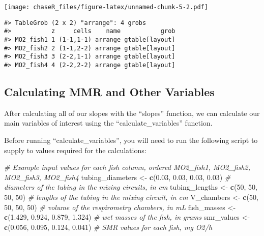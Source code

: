 \documentclass[
]{article}
\newenvironment{Shaded}{\begin{snugshade}}{\end{snugshade}}
\newcommand{\CommentTok}[1]{\textcolor[rgb]{0.56,0.35,0.01}{\textit{#1}}}
\newcommand{\DecValTok}[1]{\textcolor[rgb]{0.00,0.00,0.81}{#1}}
\newcommand{\FloatTok}[1]{\textcolor[rgb]{0.00,0.00,0.81}{#1}}
\newcommand{\FunctionTok}[1]{\textcolor[rgb]{0.13,0.29,0.53}{\textbf{#1}}}
\newcommand{\NormalTok}[1]{#1}
\newcommand{\OtherTok}[1]{\textcolor[rgb]{0.56,0.35,0.01}{#1}}
\begin{document}
\texttt{[image: chaseR\_files/figure-latex/unnamed-chunk-5-2.pdf]}

\begin{verbatim}
#> TableGrob (2 x 2) "arrange": 4 grobs
#>           z     cells    name           grob
#> MO2_fish1 1 (1-1,1-1) arrange gtable[layout]
#> MO2_fish2 2 (1-1,2-2) arrange gtable[layout]
#> MO2_fish3 3 (2-2,1-1) arrange gtable[layout]
#> MO2_fish4 4 (2-2,2-2) arrange gtable[layout]
\end{verbatim}

\subsection{Calculating MMR and Other
Variables}\label{calculating-mmr-and-other-variables}

After calculating all of our slopes with the ``slopes'' function, we can
calculate our main variables of interest using the
``calculate\_variables'' function.

Before running ``calculate\_variables'', you will need to run the
following script to supply to values required for the calculations:

\begin{Shaded}
\begin{Highlighting}[]
\CommentTok{\# Example input values for each fish column, ordered MO2\_fish1, MO2\_fish2, MO2\_fish3, MO2\_fish4}
\NormalTok{tubing\_diameters }\OtherTok{\textless{}{-}} \FunctionTok{c}\NormalTok{(}\FloatTok{0.03}\NormalTok{, }\FloatTok{0.03}\NormalTok{, }\FloatTok{0.03}\NormalTok{, }\FloatTok{0.03}\NormalTok{)  }\CommentTok{\# diameters of the tubing in the mixing circuits, in cm}
\NormalTok{tubing\_lengths }\OtherTok{\textless{}{-}} \FunctionTok{c}\NormalTok{(}\DecValTok{50}\NormalTok{, }\DecValTok{50}\NormalTok{, }\DecValTok{50}\NormalTok{, }\DecValTok{50}\NormalTok{)  }\CommentTok{\# lengths of the tubing in the mixing circuit, in cm}
\NormalTok{V\_chambers }\OtherTok{\textless{}{-}} \FunctionTok{c}\NormalTok{(}\DecValTok{50}\NormalTok{, }\DecValTok{50}\NormalTok{, }\DecValTok{50}\NormalTok{, }\DecValTok{50}\NormalTok{)  }\CommentTok{\# volume of the respirometry chambers, in mL}
\NormalTok{fish\_masses }\OtherTok{\textless{}{-}} \FunctionTok{c}\NormalTok{(}\FloatTok{1.429}\NormalTok{, }\FloatTok{0.924}\NormalTok{, }\FloatTok{0.879}\NormalTok{, }\FloatTok{1.324}\NormalTok{)  }\CommentTok{\# wet masses of the fish, in grams}
\NormalTok{smr\_values }\OtherTok{\textless{}{-}} \FunctionTok{c}\NormalTok{(}\FloatTok{0.056}\NormalTok{, }\FloatTok{0.095}\NormalTok{, }\FloatTok{0.124}\NormalTok{, }\FloatTok{0.041}\NormalTok{)  }\CommentTok{\# SMR values for each fish, mg O2/h}
\end{Highlighting}
\end{Shaded}
\end{document}
